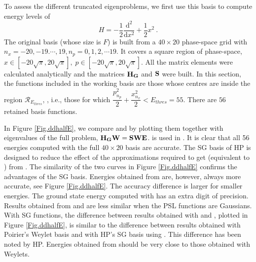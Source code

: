 To assess the different truncated eigenproblems, we first    use this basis to compute energy levels of 
\begin{equation}\label{Eq.1dharm}
H=-\dfrac{1}{2}\dfrac{\mathrm{d}^2}{\mathrm{d}x^2}+\dfrac{1}{2}x^2 ~.   
\end{equation}
%
 The original  basis   (whose size is $F$)
is built from a    $40\times 20$ phase-space grid with $n_x=-20,-19. \cdots, 19,n_p=0,1,2, \cdots 19$.   
%
 It covers a square region of phase-space, \newline
  $x\in 
\left[-20\sqrt{\pi},20\sqrt{\pi}\right],\;p\in    
\left[-20\sqrt{\pi},20\sqrt{\pi}\right]$. 
All the matrix elements were calculated  analytically and the matrices
 $ {\bf{   H_G   }} $   and  $ {\bf{   S    }} $  were built. 
In this section,  the functions included in the working basis are those whose centres are inside the region
$\mathcal{R}_{E_{thres}} $,     
, i.e., those for which  $
\dfrac{p_{n_p}^2}{2}+\dfrac{x_{n_x}^2}{2}  < {E_{thres}}= 55$.    
There are  $56$ retained basis functions. 

%


%
In Figure  \ref{Fig.ddhalfE},    we compare  and  by plotting them together with eigenvalues of the full problem,  ${\bf{ H_G W = S W E}}$.
 is used in . 
%
 It is clear that all 56   energies computed with  the full $40\times 20$ basis  are accurate.  
The SG basis of HP is designed to  
%
%
reduce the effect  of the approximations required to 
get  (equivalent to   )   from .     The similarity of the two curves in    Figure  \ref{Fig.ddhalfE} confirms the advantages of the SG basis. 
%
% 
Energies obtained from   are, however, always more accurate, see   Figure  \ref{Fig.ddhalfE}.
  The accuracy difference is larger for smaller energies.   The 
 ground state energy computed with       has    an extra digit of precision.
%
Results obtained from  and   are less similar when the PSL functions are  Gaussians.    
%
With SG functions, the difference between results obtained with   and , plotted in 
 Figure  \ref{Fig.ddhalfE}, 
 is similar to the difference between results obtained with 
Poirier's Weylet basis \cite{Poirier2003,Poirier2004a,Poirier2004b} 
and with     HP's SG basis using   . 
%
  This difference has been noted by HP.   \cite{Halverson2012}
Energies obtained from  should be very close to those obtained with Weylets.
%


